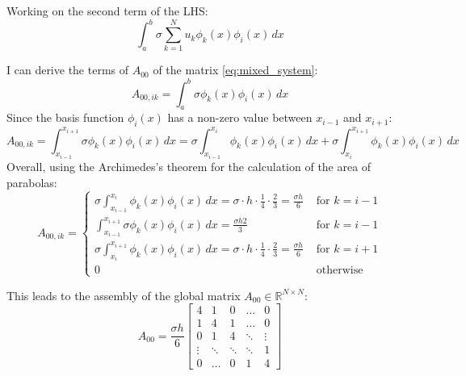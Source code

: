 \documentclass{article}
\begin{document}
Working on the second term of the LHS:
\begin{equation}
    \int_a^b \sigma \sum_{k=1}^{N} u_k \phi_k(x) \phi_i(x) \, dx
\end{equation}

I can derive the terms of $A_{00}$ of the matrix \eqref{eq:mixed_system}:
\begin{equation}
    A_{00,ik} = \int_a^b \sigma \phi_k(x) \phi_i(x) \, dx
\end{equation}
Since the basis function $\phi_i(x)$ has a non-zero value between $x_{i-1}$ and $x_{i+1}$:
 \begin{equation}
     A_{00,ik} = \int_{x_{i-1}}^{x_{i+1}} \sigma \phi_k(x) \phi_i(x) \, dx = \sigma \int_{x_{i-1}}^{x_{i}}\phi_k(x) \phi_i(x) \, dx + \sigma \int_{x_{i}}^{x_{i+1 }}\phi_k(x) \phi_i(x) \, dx 
 \end{equation}
 Overall, using the Archimedes's theorem for the calculation of the area of parabolas:
 \begin{equation}
     A_{00,ik} =
     \begin{cases}
         \sigma \int_{x_{i-1}}^{x_{i}}\phi_k(x) \phi_i(x) \, dx = \sigma \cdot h\cdot \frac{1}{4} \cdot \frac{2}{3} = \frac{\sigma h}{6}&\text{  for } k = i-1 \\
         \int_{x_{i-1}}^{x_{i+1}} \sigma \phi_k(x) \phi_i(x) \, dx = \frac{\sigma h 2}{3}&\text{  for } k = i-1 \\
         \sigma \int_{x_{i}}^{x_{i+1 }}\phi_k(x) \phi_i(x) \, dx = \sigma \cdot h\cdot \frac{1}{4} \cdot \frac{2}{3} = \frac{\sigma h}{6} &\text{  for } k = i+1 \\
         0 &\text{  otherwise}
     \end{cases}
 \end{equation}

 This leads to the assembly of the global matrix $A_{00} \in \mathbb{R}^{N \times N}$: 
\begin{equation} \label{eq:matrix_A00}
    A_{00} = \frac{\sigma h}{6}
    \begin{bmatrix}
        4 & 1 & 0 & \dots & 0 \\
        1 & 4 & 1 & \dots & 0 \\
        0 & 1 & 4 & \ddots & \vdots \\
        \vdots & \ddots & \ddots & \ddots & 1 \\
        0 & \dots & 0 & 1 & 4
    \end{bmatrix}
\end{equation}
\end{document}
